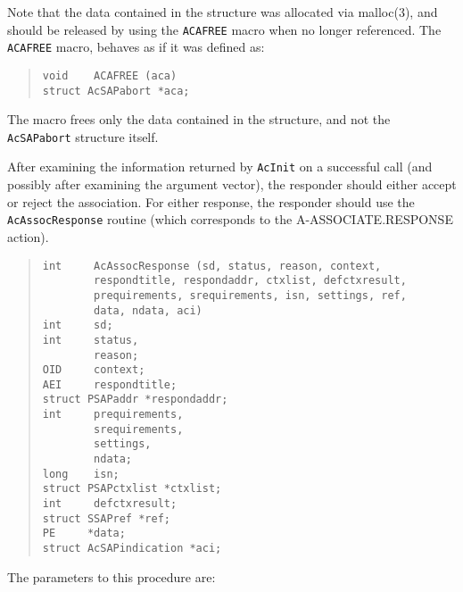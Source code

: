 Note that the data contained in the structure was allocated via \man malloc(3),
and should be released by using the \verb"ACAFREE" macro when no longer
referenced.
The \verb"ACAFREE" macro,
behaves as if it was defined as:\label{ACAFREE}
\begin{quote}\small\begin{verbatim}
void    ACAFREE (aca)
struct AcSAPabort *aca;
\end{verbatim}\end{quote}
The macro frees only the data contained in the structure,
and not the \verb"AcSAPabort" structure itself.

After examining the information returned by \verb"AcInit" on a successful call
(and possibly after examining the argument vector),
the responder should either accept or reject the association.
For either response,
the responder should use the \verb"AcAssocResponse" routine
(which corresponds to the {\sf A-ASSOCIATE.RESPONSE\/} action).
\begin{quote}\small\begin{verbatim}
int     AcAssocResponse (sd, status, reason, context, 
        respondtitle, respondaddr, ctxlist, defctxresult,
        prequirements, srequirements, isn, settings, ref,
        data, ndata, aci)
int     sd;
int     status,
        reason;
OID     context;
AEI     respondtitle;
struct PSAPaddr *respondaddr;
int     prequirements,
        srequirements,
        settings,
        ndata;
long    isn;
struct PSAPctxlist *ctxlist;
int     defctxresult;
struct SSAPref *ref;
PE     *data;
struct AcSAPindication *aci;
\end{verbatim}\end{quote}
The parameters to this procedure are:\label{AcAssocResponse}
